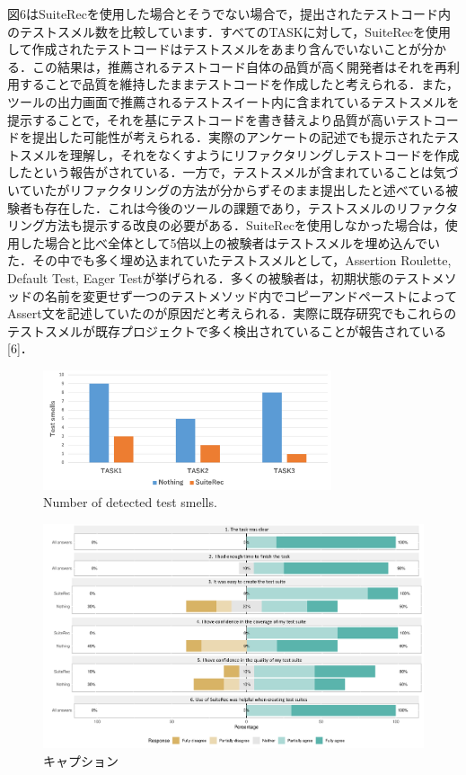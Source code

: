 \documentclass[conference]{IEEEtran}
\begin{document}
図6はSuiteRecを使用した場合とそうでない場合で，提出されたテストコード内のテストスメル数を比較しています．すべてのTASKに対して，SuiteRecを使用して作成されたテストコードはテストスメルをあまり含んでいないことが分かる．この結果は，推薦されるテストコード自体の品質が高く開発者はそれを再利用することで品質を維持したままテストコードを作成したと考えられる．また，ツールの出力画面で推薦されるテストスイート内に含まれているテストスメルを提示することで，それを基にテストコードを書き替えより品質が高いテストコードを提出した可能性が考えられる．実際のアンケートの記述でも提示されたテストスメルを理解し，それをなくすようにリファクタリングしテストコードを作成したという報告がされている．一方で，テストスメルが含まれていることは気づいていたがリファクタリングの方法が分からずそのまま提出したと述べている被験者も存在した．これは今後のツールの課題であり，テストスメルのリファクタリング方法も提示する改良の必要がある．SuiteRecを使用しなかった場合は，使用した場合と比べ全体として5倍以上の被験者はテストスメルを埋め込んでいた．その中でも多く埋め込まれていたテストスメルとして，Assertion Roulette, Default Test, Eager Testが挙げられる．多くの被験者は，初期状態のテストメソッドの名前を変更せず一つのテストメソッド内でコピーアンドペーストによってAssert文を記述していたのが原因だと考えられる．実際に既存研究でもこれらのテストスメルが既存プロジェクトで多く検出されていることが報告されている[6]． 

\begin{figure}[htbp]
\centerline{\includegraphics[width=8.5cm]{smells.pdf}}
\caption{Number of detected test smells.}
\label{fig}
\end{figure}

\begin{figure}[t]
 \begin{center}
  \includegraphics[width=18.5cm]{suiterec-expt.pdf}
  \caption{キャプション}
  \label{}
 \end{center}
\end{figure}
\end{document}

